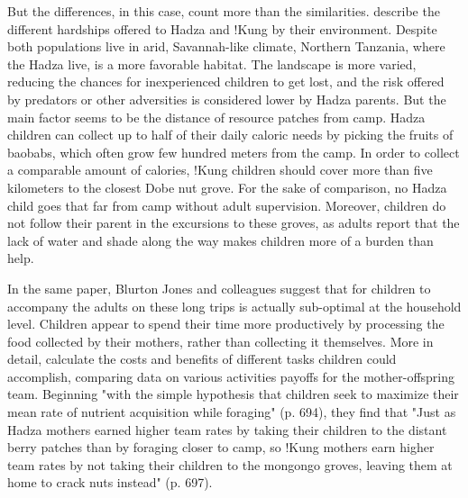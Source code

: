 But the differences, in this case, count more than the similarities.
\cite{blurton_jones_foraging_1994, blurton_jones_differences_1994} describe the different hardships offered to Hadza and !Kung by their environment. Despite both populations live in arid, Savannah-like climate, Northern Tanzania, where the Hadza live, is a more favorable habitat. The landscape is more varied, reducing the chances for inexperienced children to get lost, and the risk offered by predators or other adversities is considered lower by Hadza parents. But the main factor seems to be the distance of resource patches from camp. Hadza children can collect up to half of their daily caloric needs by picking the fruits of baobabs, which often grow few hundred meters from the camp. In order to collect a comparable amount of calories, !Kung children should cover more than five kilometers to the closest Dobe nut grove. For the sake of comparison, no Hadza child goes that far from camp without adult supervision. Moreover, children do not follow their parent in the excursions to these groves, as adults report that the lack of water and shade along the way makes children more of a burden than help. 

In the same paper, Blurton Jones and colleagues suggest that for children to accompany the adults on these long trips is actually sub-optimal at the household level. Children appear to spend their time more productively by processing the food collected by their mothers, rather than collecting it themselves. More in detail, \cite{hawkes_hadza_1995} calculate the costs and benefits of different tasks children could accomplish, comparing data on various activities payoffs for the mother-offspring team. Beginning "with the simple hypothesis that children seek to maximize their mean rate of nutrient acquisition while foraging" (p. 694), they find that "Just as Hadza mothers earned higher team rates by taking their children to the distant berry patches than by foraging closer to camp, so !Kung mothers earn higher team rates by not taking their children to the mongongo groves, leaving them at home to crack nuts instead" (p. 697).



